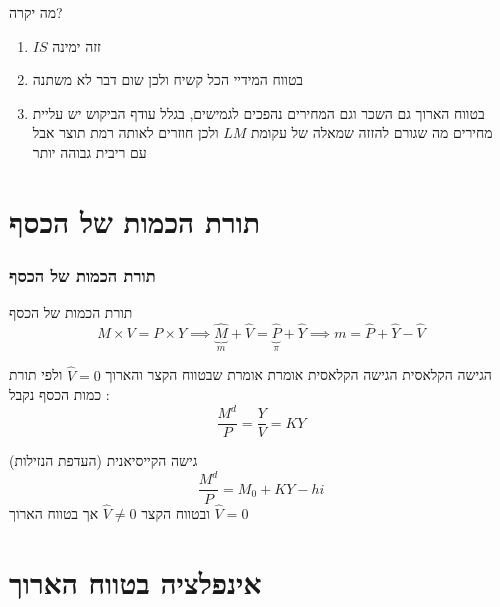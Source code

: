 \documentclass[10pt,usenames,dvipsnames]{beamer}
\begin{document}
\begin{RTL}
\begin{frame}[allowframebreaks]
\begin{center}
\begin{tikzpicture}[scale=1.3, thick, dot/.style={circle,inner sep=1pt,fill,name=#1}]
          
          \end{tikzpicture}
    \end{center}
    \framebreak
    \begin{block}{מה יקרה?}
        \begin{enumerate}
            \item $IS$ זזה ימינה
            \item בטווח המידיי הכל קשיח ולכן שום דבר לא משתנה
            \item בטווח הארוך גם השכר וגם המחירים נהפכים לגמישים, בגלל עודף הביקוש יש עליית מחירים מה שגורם להזזה שמאלה של עקומת $LM$ ולכן חוזרים לאותה רמת תוצר אבל עם ריבית גבוהה יותר
        \end{enumerate}
    \end{block}

\end{frame}

\section{תורת הכמות של הכסף}
\begin{frame}[allowframebreaks]
    \frametitle{תורת הכמות של הכסף}
    \begin{block}{תורת הכמות של הכסף}
        $$M \times V = P \times Y \implies \underbrace{\widehat{M}}_{m} + \widehat{V} = \underbrace{\widehat{P}}_{\pi} + \widehat{Y} \implies  m = \widehat{P} + \widehat{Y} - \widehat{V}$$
    \end{block}
    
    \begin{block}{הגישה הקלאסית}
        הגישה הקלאסית אומרת אומרת שבטווח הקצר והארוך $\widehat{V} = 0$ ולפי תורת כמות הכסף נקבל :
        $$\frac{M^d}{P} = \frac{Y}{V} = KY$$
    \end{block}

    \begin{block}{גישה הקייסיאנית (העדפת הנזילות)}
        $$\frac{M^d}{P} = M_0 + KY - hi$$
        ובטווח הקצר $\widehat{V} \neq 0$ אך בטווח הארוך $\widehat{V} = 0$
    \end{block}

\end{frame}


\section{אינפלציה בטווח הארוך}


\end{RTL}
\end{document}
